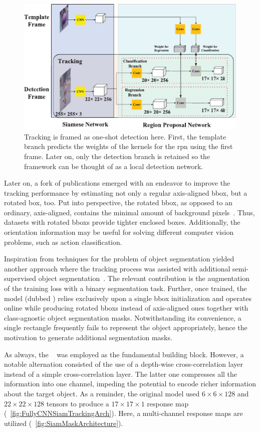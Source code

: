 \begin{figure}[t]
    \centerline{\includegraphics[width=0.7\linewidth]{figures/theoretical_foundations/siam_rpn_one_shot_detection.pdf}}
    \caption[Tracking as one-shot detection]{Tracking is framed as one-shot detection here. First, the template branch predicts the weights of the kernels for the \gls{rpn} using the first frame. Later on, only the detection branch is retained so the framework can be thought of as a local detection network. }
    \label{fig:SiamRPNOneShotDetection}
\end{figure}

Later on, a fork of publications emerged with an endeavor to improve the tracking performance by estimating not only a regular axis-aligned \gls{bbox}, but a rotated box, too. Put into perspective, the rotated \gls{bbox}, as opposed to an ordinary, axis-aligned, contains the minimal amount of background pixels~\cite{chen2019rotbboxes}. Thus, datasets with rotated \glspl{bbox} provide tighter enclosed boxes. Additionally, the orientation information may be useful for solving different computer vision problems, such as action classification.

Inspiration from techniques for the problem of object segmentation yielded another approach where the tracking process was assisted with additional semi-supervised object segmentation~\cite{wang2019siammask}. The relevant contribution is the augmentation of the training loss with a binary segmentation task. Further, once trained, the model (dubbed ) relies exclusively upon a single \gls{bbox} initialization and operates online while producing rotated \glspl{bbox} instead of axis-aligned ones together with class-agnostic object segmentation masks. Notwithstanding its convenience, a single rectangle frequently fails to represent the object appropriately, hence the motivation to generate additional segmentation masks.

As always, the ~\cite{bertinetto2016siamfc} was employed as the fundamental building block. However, a notable alternation consisted of the use of a depth-wise cross-correlation layer instead of a simple cross-correlation layer. The latter one compresses all the information into one channel, impeding the potential to encode richer information about the target object. As a reminder, the original model used $6 \times 6 \times 128$ and $22 \times 22 \times 128$ tensors to produce a $17 \times 17 \times 1$ response map (\figstr{}~\ref{fig:FullyCNNSiamTrackingArch}). Here, a multi-channel response maps are utilized (\figstr{}~\ref{fig:SiamMaskArchitecture}).

